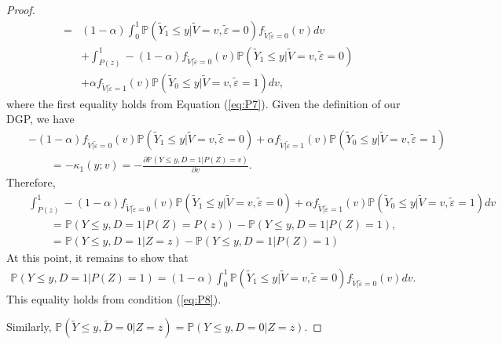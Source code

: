 \documentclass[11pt,reqno]{amsart}
\theoremstyle{plain}
\numberwithin{equation}{section}
\begin{document}
\begin{proof}
\begin{eqnarray*}
&=& (1-\alpha) \int^{1}_0 \mathbb P\left(\tilde{Y}_1\leq y \vert \tilde{V}=v, \tilde{\varepsilon} =0\right)f_{\tilde{V}\vert \tilde{\varepsilon}=0}(v)dv\\
&& + \int^{1}_{P(z)} -(1-\alpha) f_{\tilde{V}\vert \tilde{\varepsilon}=0}(v) \mathbb P\left(\tilde{Y}_1\leq y \vert \tilde{V}=v, \tilde{\varepsilon} =0\right)\\
&& + \alpha f_{\tilde{V}\vert \tilde{\varepsilon}=1}(v) \mathbb P\left(\tilde{Y}_0\leq y \vert \tilde{V}=v, \tilde{\varepsilon} =1\right)dv,
\end{eqnarray*}
where the first equality holds from Equation (\ref{eq:P7}).
Given the definition of our DGP, we have
\begin{eqnarray*}
&& -(1-\alpha) f_{\tilde{V}\vert \tilde{\varepsilon}=0}(v) \mathbb P\left(\tilde{Y}_1\leq y \vert \tilde{V}=v, \tilde{\varepsilon} =0\right)+ \alpha f_{\tilde{V}\vert \tilde{\varepsilon}=1}(v) \mathbb P\left(\tilde{Y}_0\leq y \vert \tilde{V}=v, \tilde{\varepsilon}=1\right)\\
&& \qquad = - \kappa_1(y;v)= - \frac{\partial \mathbb P(Y\leq y, D=1 \vert P(Z)=v)}{\partial v}.
\end{eqnarray*}
Therefore,
\begin{eqnarray*}
&&\int^{1}_{P(z)} -(1-\alpha) f_{\tilde{V}\vert \tilde{\varepsilon}=0}(v) \mathbb P\left(\tilde{Y}_1\leq y \vert \tilde{V}=v, \tilde{\varepsilon} =0\right) + \alpha f_{\tilde{V}\vert \tilde{\varepsilon}=1}(v) \mathbb P\left(\tilde{Y}_0\leq y \vert \tilde{V}=v, \tilde{\varepsilon} =1\right)dv\\
&& \qquad = \mathbb P(Y\leq y, D=1 \vert P(Z)=P(z))-\mathbb P(Y\leq y, D=1 \vert P(Z)=1),\\
&& \qquad = \mathbb P(Y\leq y, D=1 \vert Z=z)-\mathbb P(Y\leq y, D=1 \vert P(Z)=1)
\end{eqnarray*}
At this point, it remains to show that 
\begin{eqnarray*}
 \mathbb P(Y\leq y, D=1 \vert P(Z)=1) = (1-\alpha) \int^{1}_0 \mathbb P\left(\tilde{Y}_1\leq y \vert \tilde{V}=v, \tilde{\varepsilon} =0\right)f_{\tilde{V}\vert \tilde{\varepsilon}=0}(v)dv.
\end{eqnarray*}
This equality holds from condition (\ref{eq:P8}).

Similarly, $\mathbb P(\tilde{Y}\leq y, \tilde{D}=0 \vert Z=z)=\mathbb P(Y\leq y, D=0 \vert Z=z)$.
\end{proof}
\end{document}

